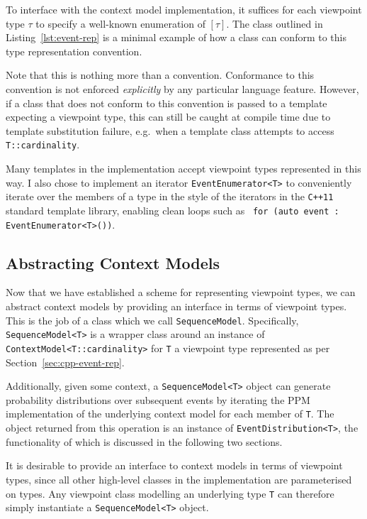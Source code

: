 \documentclass[12pt,a4paper,twoside,openright]{report}
\newcommand{\cppi}[1]{{\small \texttt{#1}}}
\begin{document}
To interface with the context model implementation, it suffices for each
viewpoint type $\tau$ to specify a well-known enumeration of $[\tau]$. The class
outlined in Listing~\ref{lst:event-rep} is a minimal example of how a class can
conform to this type representation convention.

Note that this is nothing more than a convention. Conformance to this convention
is not enforced \emph{explicitly} by any particular language feature. However,
if a class that does not conform to this convention is passed to a template
expecting a viewpoint type, this can still be caught at compile time due to
template substitution failure, e.g.\ when a template class attempts to access
\cppi{T::cardinality}.

Many templates in the implementation accept viewpoint types represented in this
way. I also chose to implement an iterator \texttt{EventEnumerator<T>} to
conveniently iterate over the members of a type in the style of the iterators in
the \texttt{C++11} standard template library, enabling clean loops such as~
\cppi{for (auto event : EventEnumerator<T>())}.

\subsection{Abstracting Context Models}

Now that we have established a scheme for representing viewpoint types, we can
abstract context models by providing an interface in terms of viewpoint types.
This is the job of a class which we call \texttt{SequenceModel}.  Specifically,
\texttt{SequenceModel<T>} is a wrapper class around an instance of
\texttt{ContextModel<T::cardinality>} for \texttt{T} a viewpoint type
represented as per Section~\ref{sec:cpp-event-rep}. 

Additionally, given some context, a \texttt{SequenceModel<T>} object can
generate probability distributions over subsequent events by iterating the
PPM implementation of the underlying context model for each member of
\texttt{T}. The object returned from this operation is an instance of
\texttt{EventDistribution<T>}, the functionality of which is discussed
in the following two sections.

It is desirable to provide an interface to context models in terms of viewpoint
types, since all other high-level classes in the implementation are
parameterised on types. Any viewpoint class modelling an underlying type
\texttt{T} can therefore simply instantiate a \texttt{SequenceModel<T>} object.
\end{document}
